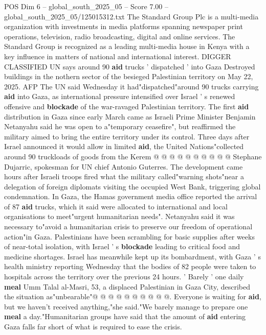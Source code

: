 \begin{textsample}{POS Dim 6 – global\_south\_2025\_05 – Score 7.00 – global\_south\_2025\_05/125015312.txt}  \label{ex:f6_pos_060}
The Standard Group Plc is a multi-media organization with investments in media platforms spanning newspaper print operations, television, radio broadcasting, digital and online services.
The Standard Group is recognized as a leading multi-media house in Kenya with a key influence in matters of national and international interest.
DIGGER CLASSIFIED UN says around 90 \textbf{aid} trucks ' dispatched ' into Gaza Destroyed buildings in the nothern sector of the besieged Palestinian territory on May 22, 2025.
AFP The UN said Wednesday it had"dispatched"around 90 trucks carrying \textbf{aid} into Gaza, as international pressure intensified over Israel ' s renewed offensive and \textbf{blockade} of the war-ravaged Palestinian territory.
The first \textbf{aid} distribution in Gaza since early March came as Israeli Prime Minister Benjamin Netanyahu said he was open to a"temporary ceasefire", but reaffirmed the military aimed to bring the entire territory under its control.
Three days after Israel announced it would allow in limited \textbf{aid}, the United Nations"collected around 90 truckloads of goods from the Kerem @ @ @ @ @ @ @ @ @ @ Stephane Dujarric, spokesman for UN chief Antonio Guterres.
The development came hours after Israeli troops fired what the military called"warning shots"near a delegation of foreign diplomats visiting the occupied West Bank, triggering global condemnation.
In Gaza, the Hamas government media office reported the arrival of 87 \textbf{aid} trucks, which it said were allocated to international and local organisations to meet"urgent humanitarian needs".
Netanyahu said it was necessary to"avoid a humanitarian crisis to preserve our freedom of operational action"in Gaza.
Palestinians have been scrambling for basic supplies after weeks of near-total isolation, with Israel ' s \textbf{blockade} leading to critical food and medicine shortages.
Israel has meanwhile kept up its bombardment, with Gaza ' s health ministry reporting Wednesday that the bodies of 82 people were taken to hospitals across the territory over the previous 24 hours. ' Barely ' one daily \textbf{meal} Umm Talal al-Masri, 53, a displaced Palestinian in Gaza City, described the situation as"unbearable"@ @ @ @ @ @ @ @ @ @.
Everyone is waiting for \textbf{aid}, but we haven't received anything,"she said."We barely manage to prepare one \textbf{meal} a day."Humanitarian groups have said that the amount of \textbf{aid} entering Gaza falls far short of what is required to ease the crisis.

\end{textsample}
